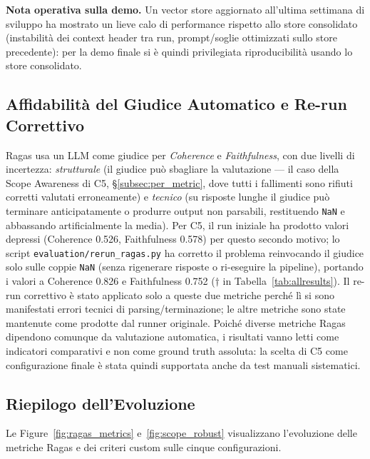 \documentclass[11pt,a4paper]{article}
\newcommand{\code}[1]{\texttt{\small#1}}
\begin{document}
\textbf{Nota operativa sulla demo.} Un vector store aggiornato all'ultima settimana di
sviluppo ha mostrato un lieve calo di performance rispetto allo store consolidato
(instabilità dei context header tra run, prompt/soglie ottimizzati sullo store
precedente): per la demo finale si è quindi privilegiata riproducibilità usando lo store
consolidato.

\subsection{Affidabilità del Giudice Automatico e Re-run Correttivo}
\label{subsec:ragas_rerun}

Ragas usa un LLM come giudice per \emph{Coherence} e \emph{Faithfulness}, con due livelli
di incertezza: \emph{strutturale} (il giudice può sbagliare la valutazione --- il caso
della Scope Awareness di C5, §\ref{subsec:per_metric}, dove tutti i fallimenti sono
rifiuti corretti valutati erroneamente) e \emph{tecnico} (su risposte lunghe il giudice
può terminare anticipatamente o produrre output non parsabili, restituendo \texttt{NaN} e
abbassando artificialmente la media). Per C5, il run iniziale ha prodotto valori
depressi (Coherence 0.526, Faithfulness 0.578) per questo secondo motivo; lo script
\code{evaluation/rerun\_ragas.py} ha corretto il problema reinvocando il giudice solo
sulle coppie \texttt{NaN} (senza rigenerare risposte o ri-eseguire la pipeline), portando
i valori a Coherence 0.826 e Faithfulness 0.752 ($\dagger$ in Tabella~\ref{tab:allresults}).
Il re-run correttivo è stato applicato solo a queste due metriche perché lì si sono
manifestati errori tecnici di parsing/terminazione; le altre metriche sono state mantenute
come prodotte dal runner originale. Poiché diverse metriche Ragas dipendono comunque da
valutazione automatica, i risultati vanno letti come indicatori comparativi e non come
ground truth assoluta: la scelta di C5 come configurazione finale è stata quindi
supportata anche da test manuali sistematici.

\subsection{Riepilogo dell'Evoluzione}
\label{subsec:evolution_summary}

Le Figure~\ref{fig:ragas_metrics} e~\ref{fig:scope_robust} visualizzano l'evoluzione
delle metriche Ragas e dei criteri custom sulle cinque configurazioni.
\end{document}
